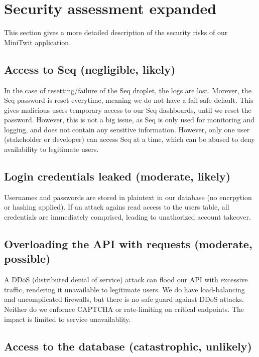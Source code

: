 \section{Security assessment expanded}
\label{appn:B}

This section gives a more detailed description of the security risks
of our MiniTwit application.

\subsection{Access to Seq (negligible, likely)}

In the case of resetting/failure of the Seq droplet, the logs 
are lost. Morever, the Seq password is reset everytime, meaning we 
do not have a fail safe default. This gives malicious users temporary 
access to our Seq dashboards, until we reset the password. However, 
this is not a big issue, as Seq is only used for monitoring and logging, 
and does not contain any sensitive information. However, only one user 
(stakeholder or developer) can access Seq at a time, 
which can be abused to deny availability to legitimate users.

\subsection{Login credentials leaked (moderate, likely)}

Usernames and passwords are stored in plaintext in our 
database (no encrpytion or hashing applied). If an attack 
agains read access to the users table, all credentials are 
immediately comprised, leading to unathorized account takeover. 

\subsection{Overloading the API with requests (moderate, possible)}

A DDoS (distributed denial of service) attack can flood our API with 
excessive traffic, rendering it unavailable to legitimate users. 
We do have load-balancing and uncomplicated firewalls, but there is no 
safe guard against DDoS attacks. Neither do we enfornce CAPTCHA or 
rate-limiting on critical endpoints. 
The impact is limited to service unavailablity. 

\subsection{Access to the database (catastrophic, unlikely)}

